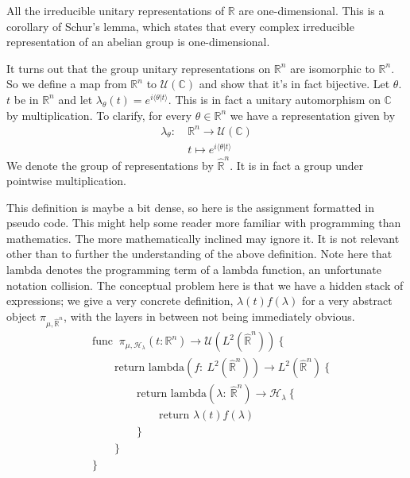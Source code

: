 \documentclass[
  12pt
]{article}
\theoremstyle{break}
\theoremstyle{plain}
\newcommand{\bbr}{\ensuremath{\mathbb{R}}\xspace}
\begin{document}
  All the irreducible unitary representations of \bbr are one-dimensional.
  This is a corollary of Schur's lemma, which states that every complex
  irreducible representation of an abelian group is one-dimensional.

  It turns out that the group unitary representations on $\mathbb{R}^n$
  are isomorphic to $\mathbb{R}^n$. So we define a map from
  $\mathbb{R}^n$ to $\mathcal{U}(\mathbb{C})$ and show that it's in
  fact bijective. Let $\theta$. $t$ be in $\mathbb{R}^n$ and let
  $\lambda_{\theta}(t) = e^{i\langle \theta | t \rangle}$. This is in
  fact a unitary automorphism on $\mathbb{C}$ by multiplication. To
  clarify, for every $\theta \in \mathbb{R}^n$ we have a representation
  given by
  \begin{align*}
    \lambda_{\theta}:\ & \mathbb{R}^n \rightarrow \mathcal{U}(\mathbb{C}) \\
    & t \mapsto e^{i \langle \theta | t \rangle}
  \end{align*}
  We denote the group of representations by $\hat{\mathbb{R}}^n$. It
  is in fact a group under pointwise multiplication.


  This definition is maybe a bit dense, so here is the assignment formatted in
  pseudo code. This might help some reader more familiar with programming than
  mathematics. The more mathematically inclined may ignore it. It is not
  relevant other than to further the understanding of the above definition.
  Note here that $\text{lambda}$ denotes the programming term of a lambda
  function, an unfortunate notation collision.
  The conceptual problem here is that we have a hidden stack of expressions; we give a very concrete definition, $\lambda(t)f(\lambda)$ for a very abstract object $\pi_{\mu, \hat{\bbr}^n}$, with the layers in between not being immediately obvious.
  \begin{align*}
  & \text{func }\ \pi_{\mu,\mathscr{H}_{\lambda}}(t: \mathbb{R}^n) \rightarrow \mathcal{U}(L^2(\hat{\mathbb{R}}^n)) \ \{ \\
  & \qquad \text{return lambda}(f:\ L^2(\hat{\mathbb{R}}^n)) \rightarrow L^2(\hat{\mathbb{R}}^n) \ \{ \\
  & \qquad \qquad \text{return lambda}(\lambda:\ \hat{\mathbb{R}}^n) \rightarrow \mathscr{H}_{\lambda} \ \{ \\
  & \qquad \qquad \qquad \text{return }\lambda(t)f(\lambda) \\
  & \qquad \qquad \} \\
  & \qquad \} \\
  & \} \\
  \end{align*}
\end{document}
